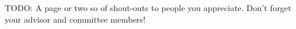 \acknowledgment

TODO: A page or two so of shout-outs to people you appreciate.  Don't forget
your advisor and committee members!

